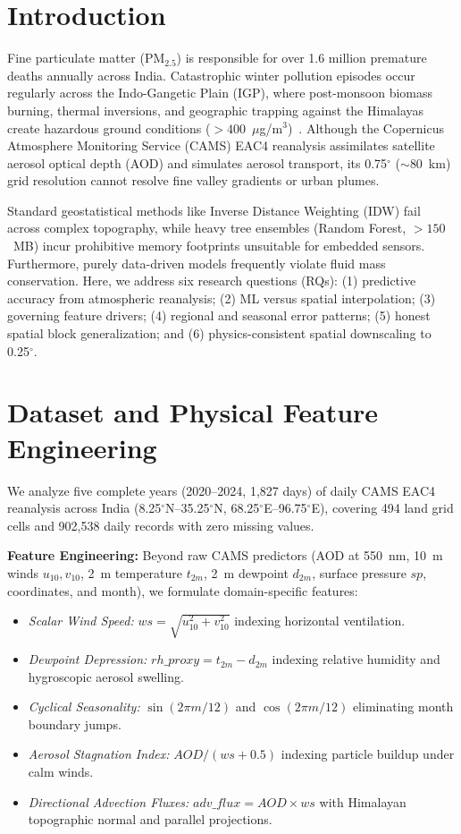 \documentclass[conference]{IEEEtran}
\begin{document}
\section{Introduction}
Fine particulate matter (PM$_{2.5}$) is responsible for over 1.6 million premature deaths annually across India. Catastrophic winter pollution episodes occur regularly across the Indo-Gangetic Plain (IGP), where post-monsoon biomass burning, thermal inversions, and geographic trapping against the Himalayas create hazardous ground conditions ($>400$~$\mu$g/m$^3$)~\cite{b1}. Although the Copernicus Atmosphere Monitoring Service (CAMS) EAC4 reanalysis assimilates satellite aerosol optical depth (AOD) and simulates aerosol transport, its 0.75$^\circ$ ($\sim$80~km) grid resolution cannot resolve fine valley gradients or urban plumes.

Standard geostatistical methods like Inverse Distance Weighting (IDW) fail across complex topography, while heavy tree ensembles (Random Forest, $>150$~MB) incur prohibitive memory footprints unsuitable for embedded sensors. Furthermore, purely data-driven models frequently violate fluid mass conservation. Here, we address six research questions (RQs): (1) predictive accuracy from atmospheric reanalysis; (2) ML versus spatial interpolation; (3) governing feature drivers; (4) regional and seasonal error patterns; (5) honest spatial block generalization; and (6) physics-consistent spatial downscaling to 0.25$^\circ$.

\section{Dataset and Physical Feature Engineering}
We analyze five complete years (2020--2024, 1,827 days) of daily CAMS EAC4 reanalysis across India (8.25$^\circ$N--35.25$^\circ$N, 68.25$^\circ$E--96.75$^\circ$E), covering 494 land grid cells and 902,538 daily records with zero missing values.

\textbf{Feature Engineering:} Beyond raw CAMS predictors (AOD at 550~nm, 10~m winds $u_{10}, v_{10}$, 2~m temperature $t_{2m}$, 2~m dewpoint $d_{2m}$, surface pressure $sp$, coordinates, and month), we formulate domain-specific features:
\begin{itemize}
    \item \textit{Scalar Wind Speed:} $ws = \sqrt{u_{10}^2 + v_{10}^2}$ indexing horizontal ventilation.
    \item \textit{Dewpoint Depression:} $rh\_proxy = t_{2m} - d_{2m}$ indexing relative humidity and hygroscopic aerosol swelling.
    \item \textit{Cyclical Seasonality:} $\sin(2\pi m / 12)$ and $\cos(2\pi m / 12)$ eliminating month boundary jumps.
    \item \textit{Aerosol Stagnation Index:} $AOD / (ws + 0.5)$ indexing particle buildup under calm winds.
    \item \textit{Directional Advection Fluxes:} $adv\_flux = AOD \times ws$ with Himalayan topographic normal and parallel projections.
\end{itemize}
\end{document}
